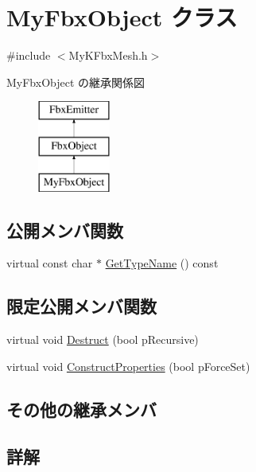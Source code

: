\hypertarget{class_my_fbx_object}{}\section{My\+Fbx\+Object クラス}
\label{class_my_fbx_object}


{\ttfamily \#include $<$My\+K\+Fbx\+Mesh.\+h$>$}

My\+Fbx\+Object の継承関係図\begin{figure}[H]
\begin{center}
\leavevmode
\includegraphics[height=3.000000cm]{class_my_fbx_object}
\end{center}
\end{figure}
\subsection*{公開メンバ関数}
\begin{DoxyCompactItemize}
\item 
virtual const char $\ast$ \hyperlink{class_my_fbx_object_a83fae0bd93495a1cf431c00fbdf8be28}{Get\+Type\+Name} () const
\end{DoxyCompactItemize}
\subsection*{限定公開メンバ関数}
\begin{DoxyCompactItemize}
\item 
virtual void \hyperlink{class_my_fbx_object_a4681d1f595d173c9db3835b34365d787}{Destruct} (bool p\+Recursive)
\item 
virtual void \hyperlink{class_my_fbx_object_ac56c33fb1ab6c49ac48346ef64e7c80a}{Construct\+Properties} (bool p\+Force\+Set)
\end{DoxyCompactItemize}
\subsection*{その他の継承メンバ}


\subsection{詳解}


